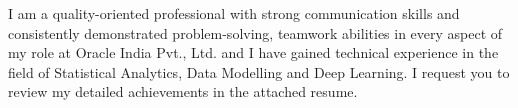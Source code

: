 I am a quality-oriented professional with strong communication skills and consistently demonstrated problem-solving, teamwork abilities in every aspect of my role at Oracle India Pvt., Ltd. and I have gained technical experience in the field of {Statistical Analytics, Data Modelling and Deep Learning}. I request you to review my detailed achievements in the attached resume.